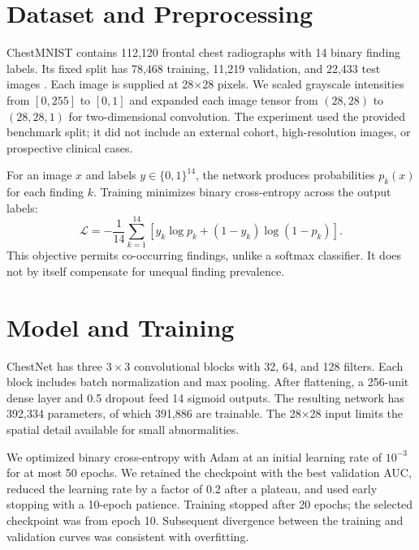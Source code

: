 \documentclass[conference]{IEEEtran}
\begin{document}
\section{Dataset and Preprocessing}
ChestMNIST contains 112,120 frontal chest radiographs with 14 binary finding labels. Its fixed split has 78,468 training, 11,219 validation, and 22,433 test images \cite{medmnist}. Each image is supplied at 28$\times$28 pixels. We scaled grayscale intensities from $[0,255]$ to $[0,1]$ and expanded each image tensor from $(28,28)$ to $(28,28,1)$ for two-dimensional convolution. The experiment used the provided benchmark split; it did not include an external cohort, high-resolution images, or prospective clinical cases.

For an image $x$ and labels $y\in\{0,1\}^{14}$, the network produces probabilities $p_k(x)$ for each finding $k$. Training minimizes binary cross-entropy across the output labels:
\begin{equation}
\mathcal{L}=-\frac{1}{14}\sum_{k=1}^{14}\left[y_k\log p_k+(1-y_k)\log(1-p_k)\right].
\end{equation}
This objective permits co-occurring findings, unlike a softmax classifier. It does not by itself compensate for unequal finding prevalence.

\section{Model and Training}
ChestNet has three $3\times3$ convolutional blocks with 32, 64, and 128 filters. Each block includes batch normalization and max pooling. After flattening, a 256-unit dense layer and 0.5 dropout feed 14 sigmoid outputs. The resulting network has 392,334 parameters, of which 391,886 are trainable. The 28$\times$28 input limits the spatial detail available for small abnormalities.

We optimized binary cross-entropy with Adam at an initial learning rate of $10^{-3}$ for at most 50 epochs. We retained the checkpoint with the best validation AUC, reduced the learning rate by a factor of 0.2 after a plateau, and used early stopping with a 10-epoch patience. Training stopped after 20 epochs; the selected checkpoint was from epoch 10. Subsequent divergence between the training and validation curves was consistent with overfitting.
\end{document}
